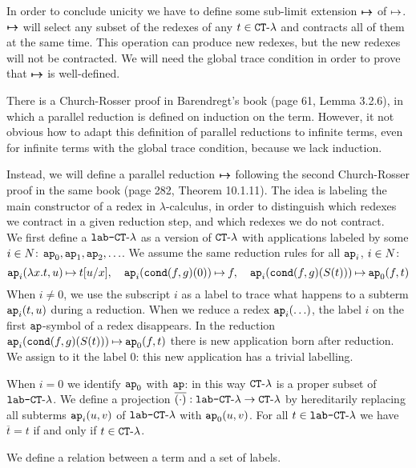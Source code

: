 In order to conclude unicity we have to define some sub-limit extension ${ \mapsto \mspace{-17mu} \mapsto }$ of $\mathbin{\mapsto}$.
${ \mapsto \mspace{-17mu} \mapsto }$ will select any subset of the redexes of any $t \in { {\tt CT}\mbox{-}\lambda}$ 
and contracts all of them at the same time. This operation can produce new redexes, but the
new redexes will not be contracted. 
We will need the global trace condition in order to prove that ${ \mapsto \mspace{-17mu} \mapsto }$ is well-defined.


There is a Church-Rosser proof in Barendregt's book (page 61, Lemma 3.2.6),
in which a parallel reduction is defined on induction on the term. 
However, it not obvious how to adapt this definition of parallel reductions to infinite terms,
even for infinite terms with the global trace condition, because we lack induction.

Instead, we will define a parallel reduction ${ \mapsto \mspace{-17mu} \mapsto }$ following the second
Church-Rosser proof in the same book (page 282, Theorem 10.1.11).
The idea is labeling the main constructor of a redex in $\lambda$-calculus,
in order to distinguish which redexes we contract in a given reduction step, and which 
redexes we do not contract.
\\



We first define a \emph{}
 ${\mbox{\tt lab-}{ {\tt CT}\mbox{-}\lambda}}$ as a version of ${ {\tt CT}\mbox{-}\lambda}$ 
with applications labeled by some $i \in {N}$:
${\tt ap}_0, {\tt ap}_1, {\tt ap}_2, \ldots$. We assume the same reduction rules for all ${\tt ap}_i$, $i \in {N}$:
$$
\ap_i(\lambda x.t,u) \reduces t[u/x], \ \ \ 
\ap_i(\cond(f,g)(0)) \reduces f, \ \ \ 
\ap_i(\cond(f,g)(S(t))) \reduces \ap_0(f,t)
$$
When $i \not = 0$, we use the subscript $i$ as a label to trace what
happens to a subterm ${\tt ap}_i(t,u)$ during a reduction. When we reduce a redex ${\tt ap}_i(\ldots)$,
the label $i$ on the first ${\tt ap}$-symbol of a redex disappears. 
In the reduction ${\tt ap}_i({\tt cond}(f,g)(S(t))) \mathbin{\mapsto} {\tt ap}_0(f,t)$ there is new application born after reduction. 
We assign to it the label $0$: this new application has a trivial labelling.

When $i=0$ we identify ${\tt ap}_0$ with ${\tt ap}$: in this way ${ {\tt CT}\mbox{-}\lambda}$  is a proper
subset of ${\mbox{\tt lab-}{ {\tt CT}\mbox{-}\lambda}}$.
We define a projection $\overline{(\cdot)} : {\mbox{\tt lab-}{ {\tt CT}\mbox{-}\lambda}} \rightarrow { {\tt CT}\mbox{-}\lambda}$
by hereditarily replacing all subterms ${\tt ap}_i(u,v)$ of ${\mbox{\tt lab-}{ {\tt CT}\mbox{-}\lambda}}$ with 
 ${\tt ap}_0(u,v)$. For all $t \in {\mbox{\tt lab-} { {\tt CT}\mbox{-}\lambda} }$ we have  $\overline{t} = t$
if and only if $t \in { {\tt CT}\mbox{-}\lambda}$. 

We define a relation between a term and a set of labels.

